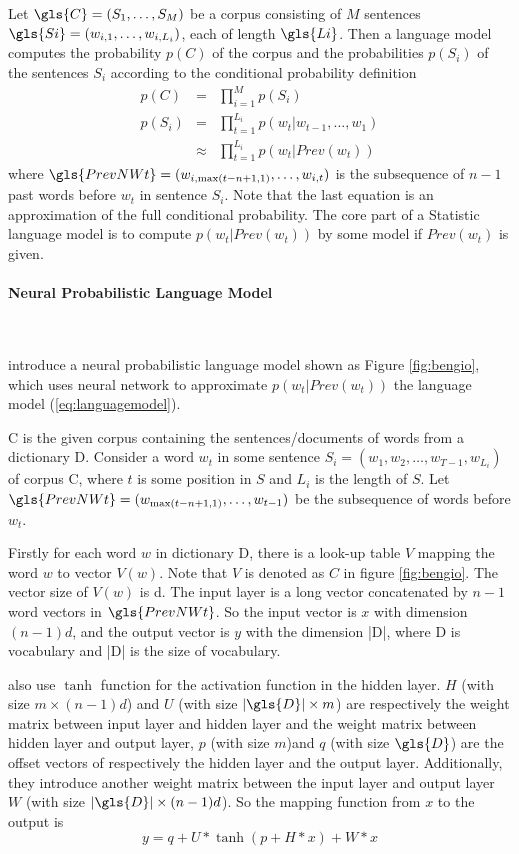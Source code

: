 Let $\gls{C}=(S_1,\ldots,S_M)$ be a corpus consisting of $M$ sentences $\gls{Si}=(w_{i,1},\ldots,w_{i,L_i})$, each of length $\gls{Li}$.  Then a language model computes the probability $p(C)$ of the corpus and the probabilities $p(S_i)$ of the sentences $S_i$ according to the conditional probability definition
\begin{eqnarray}
p(C) &=& \prod_{i = 1}^M p(S_i) \\
p(S_i)&=& \prod_{t=1}^{L_i} p(w_t|w_{t-1},\ldots,w_1)\nonumber \\
&\approx& \prod_{t=1}^{L_i} p(w_t|Prev(w_t)) \label{eq:languagemodel}
\end{eqnarray}
where $\gls{PrevNWt}=(w_{i,\max(t-n+1,1)},\ldots,w_{i,t})$ is the subsequence of $n-1$ past words before $w_t$ in sentence $S_i$. Note that the last equation is an approximation of the full conditional probability. The core part of a Statistic language model is to compute  $p(w_t|Prev(w_t))$ by some model if $Prev(w_t)$ is given.

\paragraph{Neural Probabilistic Language Model}\

\cite{BengioDucharmeEtAl2003} introduce a neural probabilistic language model shown as Figure \ref{fig:bengio}, which uses neural network to approximate $p(w_t|Prev(w_t))$
the language model (\ref{eq:languagemodel}).

\gls{C} is the given corpus containing the sentences/documents of words from a dictionary \gls{D}.
Consider a word $w_t$ in some sentence $S_i = (w_1,w_2,\ldots,w_{T-1},w_{L_i})$ of corpus \gls{C}, where $t$ is some position in $S$ and $L_i$ is the length of $S$. Let  $\gls{PrevNWt} = (w_{\max(t-n+1,1)},\ldots,w_{t-1})$ be the subsequence of words before $w_t$.  

Firstly for each word $w$ in dictionary \gls{D}, there is a look-up table $V$ mapping the word $w$ to vector $V(w)$. Note that $V$ is denoted as $C$ in figure \ref{fig:bengio}. The vector size of $V(w)$ is \gls{d}.
The input layer is a long vector concatenated by $n-1$ word vectors in $\gls{PrevNWt}$. So the input vector is $x$ with dimension $(n-1)d$, and the output vector is $y$ with the dimension |\gls{D}|, where \gls{D} is vocabulary and |\gls{D}| is the size of vocabulary.

\cite{BengioDucharmeEtAl2003} also use $\tanh$ function for the activation function in the hidden layer. $H$ (with size $m\times (n-1)d $) and $U$ (with size $|\gls{D}| \times m $) are respectively the weight matrix between input layer and hidden layer and the weight matrix between hidden layer and output layer, $p$ (with size $m$)and $q$ (with size $\gls{D}$) are the offset vectors of respectively the hidden layer and the output layer. Additionally, they introduce another weight matrix between the input layer and output layer $W$ (with size $|\gls{D}| \times (n-1)d$). So the mapping function from $x$ to the output is
\begin{equation}\label{eq:bengio}
y=q+U*\tanh(p+H*x) + W*x
\end{equation}

